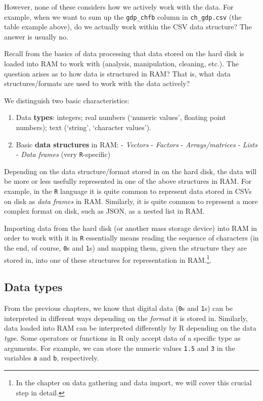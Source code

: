 \documentclass[
  12pt,
]{style/krantz}
\providecommand{\tightlist}{%
  \setlength{\itemsep}{0pt}\setlength{\parskip}{0pt}}
\begin{document}
However, none of these considers how we actively work with the data. For example, when we want to sum up the \texttt{gdp\_chfb} column in \texttt{ch\_gdp.csv} (the table example above), do we actually work within the CSV data structure? The answer is usually no.

Recall from the basics of data processing that data stored on the hard disk is loaded into RAM to work with (analysis, manipulation, cleaning, etc.). The question arises as to how data is structured in RAM? That is, what data structures/formats are used to work with the data actively?

We distinguish two basic characteristics:

\begin{enumerate}
\def\labelenumi{\arabic{enumi}.}
\tightlist
\item
  Data \textbf{types}: integers; real numbers (`numeric values', floating point numbers); text (`string', `character values').
\item
  Basic \textbf{data structures} in RAM:
  - \emph{Vectors}
  - \emph{Factors}
  - \emph{Arrays/matrices}
  - \emph{Lists}
  - \emph{Data frames} (very \texttt{R}-specific)
\end{enumerate}

Depending on the data structure/format stored in on the hard disk, the data will be more or less usefully represented in one of the above structures in RAM. For example, in the \texttt{R} language it is quite common to represent data stored in CSVs on disk as \emph{data frames} in RAM. Similarly, it is quite common to represent a more complex format on disk, such as JSON, as a nested list in RAM.

Importing data from the hard disk (or another mass storage device) into RAM in order to work with it in \texttt{R} essentially means reading the sequence of characters (in the end, of course, \texttt{0}s and \texttt{1}s) and mapping them, given the structure they are stored in, into one of these structures for representation in RAM.\footnote{In the chapter on data gathering and data import, we will cover this crucial step in detail.}.

\hypertarget{data-types}{%
\subsection{Data types}\label{data-types}}

From the previous chapters, we know that digital data (\texttt{0}s and \texttt{1}s) can be interpreted in different ways depending on the \emph{format} it is stored in. Similarly, data loaded into RAM can be interpreted differently by R depending on the data \emph{type}. Some operators or functions in R only accept data of a specific type as arguments. For example, we can store the numeric values \texttt{1.5} and \texttt{3} in the variables \texttt{a} and \texttt{b}, respectively.
\end{document}
